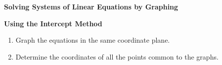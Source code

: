 \begin{center}
\textbf{Solving Systems of Linear Equations by Graphing}
\end{center}

\vspace*{1ex}

\textbf{Using the Intercept Method}
\begin{enumerate}[label = \arabic*. ]
\item \hspce Graph the equations in the same coordinate plane. 
\item \hspce Determine the coordinates of all the points common to the graphs. 

\end{enumerate}  

